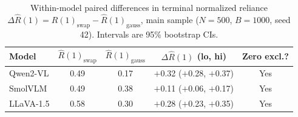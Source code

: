 \begin{table}[t]
\centering
\caption{Within-model paired differences in terminal normalized reliance
  $\Delta\hat{R}(1) = \hat{R}(1)_{\text{swap}} - \hat{R}(1)_{\text{gauss}}$,
  main sample ($N=500$, $B=1000$, seed 42). Intervals are 95\% bootstrap CIs.}
\label{tab:paired}
{\footnotesize\setlength{\tabcolsep}{3pt}%
\begin{tabular}{lcccc}
\toprule
\textbf{Model} & $\hat{R}(1)_{\text{swap}}$ & $\hat{R}(1)_{\text{gauss}}$ & $\Delta\hat{R}(1)$ (lo, hi) & Zero excl.? \\
\midrule
Qwen2-VL  & 0.49 & 0.17 & $+$0.32 ($+$0.28, $+$0.37) & Yes \\
SmolVLM   & 0.49 & 0.38 & $+$0.11 ($+$0.06, $+$0.17) & Yes \\
LLaVA-1.5 & 0.58 & 0.30 & $+$0.28 ($+$0.23, $+$0.35) & Yes \\
\bottomrule
\end{tabular}}
\end{table}

